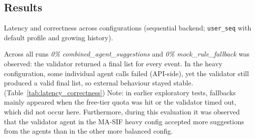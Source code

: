 \subsection*{Results}
\begin{table}[h]
\centering
\caption{Latency and correctness across configurations (sequential backend; \texttt{user\_seq} with default profile and growing history).}
\setlength{\tabcolsep}{4pt}
\small
{}
\label{tab:latency_correctness}
\caption*{\textit{Legend.} WS p50/p90/max: WebSocket round-trip latency percentiles and maximum (ms). Suite p50/p90/max: end-to-end latency percentiles and maximum for the deterministic event suite (ms). Schema-valid: share of responses that passed JSON schema validation (\%). \textit{n}: number of events.}
\end{table}

Across all runs \emph{0\% combined\_agent\_suggestions} and \emph{0\% mock\_rule\_fallback} was observed: the validator returned a final list for every event. In the heavy configuration, some individual agent calls failed (API-side), yet the validator still produced a valid final list, so external behaviour stayed stable. (Table~\ref{tab:latency_correctness})
Note: in earlier exploratory tests, fallbacks mainly appeared when the free-tier quota was hit or the validator timed out, which did not occur here. Furthermore, during this evaluation it was observed that the validator agent in the MA-SIF heavy config accepted more suggestions from the agents than in the other more balanced config.

